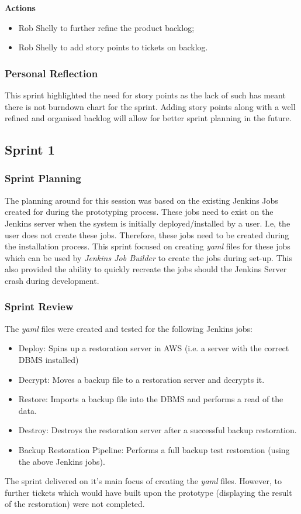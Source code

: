 		\noindent\textbf{Actions}
		\begin{itemize}
			\item Rob Shelly to further refine the product backlog;
			\item Rob Shelly to add story points to tickets on backlog.
		\end{itemize}
		
		\subsubsection{Personal Reflection}
		This sprint highlighted the need for story points as the lack of such has meant there is not burndown chart for the sprint. Adding story points along with a well refined and organised backlog will allow for better sprint planning in the future.

	\subsection{Sprint 1}
		\subsubsection{Sprint Planning}
		The planning around for this session was based on the existing Jenkins Jobs created for during the prototyping process. These jobs need to exist on the Jenkins server when the system is initially deployed/installed by a user. I.e, the user does not create these jobs.
		Therefore, these jobs need to be created during the installation process. This sprint focused on creating \textit{yaml} files for these jobs which can be used by \textit{Jenkins Job Builder} to create the jobs during set-up. This also provided the ability to quickly recreate the jobs should the Jenkins Server crash during development.

		\subsubsection{Sprint Review}
		The \textit{yaml} files were created and tested for the following Jenkins jobs:
		\begin{itemize}
			\item Deploy: Spins up a restoration server in AWS (i.e. a server with the correct DBMS installed)
			\item Decrypt:  Moves a backup file to a restoration server and decrypts it.
			\item Restore: Imports a backup file into the DBMS and performs a read of the data.
			\item Destroy: Destroys the restoration server after a successful backup restoration.
			\item Backup Restoration Pipeline:	Performs a full backup test restoration (using the above Jenkins jobs).
		\end{itemize}
		The sprint delivered on it's main focus of creating the \textit{yaml} files. However, to further tickets which would have built upon the prototype (displaying the result of the restoration) were not completed.

